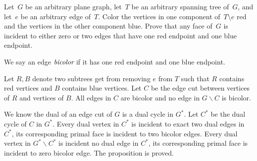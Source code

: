 \documentclass[11pt]{article}
\begin{document}
Let~\(G\) be an arbitrary plane graph, let~\(T\) be an arbitrary spanning tree of~\(G\), and
let~\(e\) be an arbitrary edge of~\(T\).
Color the vertices in one component of~\(T \setminus e\) red and the vertices in the other
component blue.
Prove that any face of~\(G\) is incident to either zero or two edges that have one red endpoint
and one blue endpoint.

\begin{solution}
  We say an edge \(\emph{bicolor}\) if it has one red endpoint and one blue endpoint.

  Let \(R,B\) denote two subtrees get from removing \(e\) from \(T\) such that \(R\) contains red vertices and \(B\) contains blue vertices.
  Let \(C\) be the edge cut between vertices of \(R\) and vertices of \(B\). All edges in \(C\) are bicolor and no edge in \(G\backslash C\) is bicolor.

  We know the dual of an edge cut of \(G\) is a dual cycle in \(G^*\).
  Let \(C^*\) be the dual cycle of \(C\) in \(G^*\).
  Every dual vertex in \(C^*\) is incident to exact two dual edges in \(C^*\), its corresponding primal face is incident to two bicolor edges. Every dual vertex in \(G^*\backslash C^*\) is incident no dual edge in \(C^*\), its corresponding primal face is incident to zero bicolor edge. The proposition is proved.


\end{solution}
\end{document}
